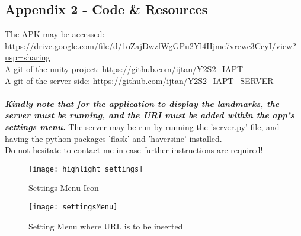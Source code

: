 \subsection*{Appendix 2 - Code \& Resources}
The APK may be accessed: \url{https://drive.google.com/file/d/1oZajDwzfWgGPu2Yl4Hjmc7vrewc3CcyI/view?usp=sharing}\\
A git of the unity project: \url{https://github.com/ijtan/Y2S2_IAPT}\\
A git of the server-side: \url{https://github.com/ijtan/Y2S2_IAPT_SERVER}\\
\\\noindent
\textbf{\emph{Kindly note that for the application to display the landmarks, the server must be running, and the URI 
must be added within the app's settings menu.}} The server may be run by running the 'server.py' file, and having the python packages 'flask' and 'haversine' installed.\\
Do not hesitate to contact me in case further instructions are required!
\begin{figure}[!htb]
        \texttt{[image: highlight\_settings]}
            \caption{Settings Menu Icon}
            \label{fig:earth_og}
    \endminipage\hfill
        \texttt{[image: settingsMenu]}
        \caption{Setting Menu where URL is to be inserted}
        \label{fig:settmen}
    \endminipage
    \end{figure}